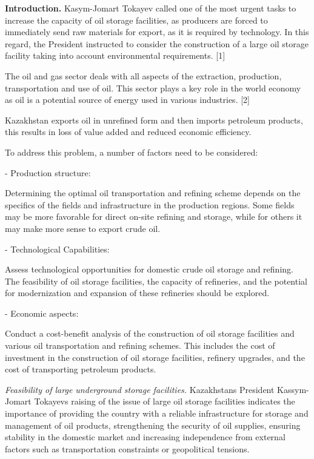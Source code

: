 \begin{multicols}{2}
{\bfseries Introduction.} Kasym-Jomart Tokayev called one of the most
urgent tasks to increase the capacity of oil storage facilities, as
producers are forced to immediately send raw materials for export, as it
is required by technology. In this regard, the President instructed to
consider the construction of a large oil storage facility taking into
account environmental requirements. {[}1{]}

The oil and gas sector deals with all aspects of the extraction,
production, transportation and use of oil. This sector plays a key role
in the world economy as oil is a potential source of energy used in
various industries. {[}2{]}

Kazakhstan exports oil in unrefined form and then imports petroleum
products, this results in loss of value added and reduced economic
efficiency.

To address this problem, a number of factors need to be considered:

- Production structure:

Determining the optimal oil transportation and refining scheme depends
on the specifics of the fields and infrastructure in the production
regions. Some fields may be more favorable for direct on-site refining
and storage, while for others it may make more sense to export crude
oil.

- Technological Capabilities:

Assess technological opportunities for domestic crude oil storage and
refining. The feasibility of oil storage facilities, the capacity of
refineries, and the potential for modernization and expansion of these
refineries should be explored.

- Economic aspects:

Conduct a cost-benefit analysis of the construction of oil storage
facilities and various oil transportation and refining schemes. This
includes the cost of investment in the construction of oil storage
facilities, refinery upgrades, and the cost of transporting petroleum
products.

\emph{Feasibility of large underground storage facilities.}
Kazakhstan\textquotesingle s President Kassym-Jomart
Tokayev\textquotesingle s raising of the issue of large oil storage
facilities indicates the importance of providing the country with a
reliable infrastructure for storage and management of oil products,
strengthening the security of oil supplies, ensuring stability in the
domestic market and increasing independence from external factors such
as transportation constraints or geopolitical tensions.


\end{multicols}
